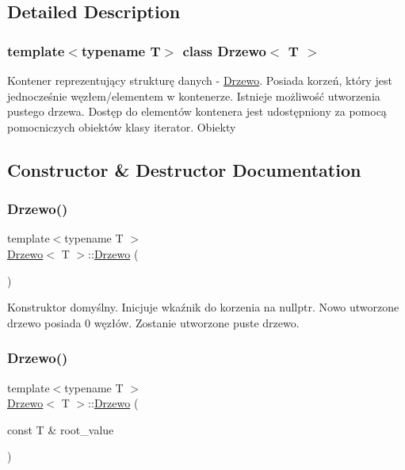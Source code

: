 \subsection{Detailed Description}
\subsubsection*{template$<$typename T$>$\newline
class Drzewo$<$ T $>$}

Kontener reprezentujący strukturę danych -\/ \hyperlink{class_drzewo}{Drzewo}. Posiada korzeń, który jest jednocześnie węzłem/elementem w kontenerze. Istnieje możliwość utworzenia pustego drzewa. Dostęp do elementów kontenera jest udostępniony za pomocą pomocniczych obiektów klasy iterator. Obiekty 

\subsection{Constructor \& Destructor Documentation}
\mbox{\label{class_drzewo_a9b87f8101458fea6c866ffd01efa9ef6}} 
\subsubsection{\texorpdfstring{Drzewo()}{Drzewo()}\hspace{0.1cm}{\footnotesize\ttfamily [1/3]}}
{\footnotesize\ttfamily template$<$typename T $>$ \\
\hyperlink{class_drzewo}{Drzewo}$<$ T $>$\+::\hyperlink{class_drzewo}{Drzewo} (\begin{DoxyParamCaption}{ }\end{DoxyParamCaption})}

Konstruktor domyślny. Inicjuje wkaźnik do korzenia na \textquotesingle{}nullptr\textquotesingle{}. Nowo utworzone drzewo posiada 0 węzłów. Zostanie utworzone puste drzewo. \mbox{\label{class_drzewo_a18f9e596cec9dd18eed19f2b613a7c44}} 
\subsubsection{\texorpdfstring{Drzewo()}{Drzewo()}\hspace{0.1cm}{\footnotesize\ttfamily [2/3]}}
{\footnotesize\ttfamily template$<$typename T $>$ \\
\hyperlink{class_drzewo}{Drzewo}$<$ T $>$\+::\hyperlink{class_drzewo}{Drzewo} (\begin{DoxyParamCaption}\item[{const T \&}]{root\+\_\+value }\end{DoxyParamCaption})}

